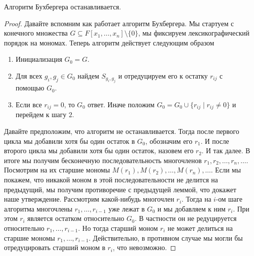 \begin{claim}
\label{claim::BuchbergerTerminates}
Алгоритм Бухбергера останавливается.
\end{claim}
\begin{proof}
Давайте вспомним как работает алгоритм Бухбергера.
Мы стартуем с конечного множества $G \subseteq F[x_1,\ldots, x_n]\setminus\{0\}$, мы фиксируем лексикографический порядок на мономах.
Теперь алгоритм действует следующим образом
\begin{enumerate}
\item Инициализация $G_0 = G$.

\item Для всех $g_i,g_j\in G_0$ найдем $S_{g_i, g_j}$ и отредуцируем его к остатку $r_{ij}$ с помощью  $G_0$.

\item Если все $r_{ij} = 0$, то $G_0$ ответ.
Иначе положим $G_0 = G_0 \cup \{r_{ij}\mid r_{ij}\neq 0\}$ и перейдем к шагу $2$.
\end{enumerate}
Давайте предположим, что алгоритм не останавливается.
Тогда после первого цикла мы добавили хотя бы один остаток в $G_0$, обозначим его $r_1$.
И после второго цикла мы добавили хотя бы один остаток, назовем его $r_2$.
И так далее.
В итоге мы получим бесконечную последовательность многочленов $r_1,r_2,\ldots, r_n,\ldots$.
Посмотрим на их старшие мономы $M(r_1), M(r_2), \ldots, M(r_n),\ldots$.
Если мы покажем, что никакой моном в этой последовательности не делится на предыдущий, мы получим противоречие с предыдущей леммой, что докажет наше утверждение.
Рассмотрим какой-нибудь многочлен $r_i$.
Тогда на $i$-ом шаге алгоритма многочлены $r_1,\ldots, r_{i-1}$ уже лежат в $G_0$ и мы добавляем к ним $r_i$.
При этом $r_i$ является остатком относительно $G_0$.
В частности он не редуцируется относительно $r_1,\ldots, r_{i-1}$.
Но тогда старший моном $r_i$ не может делиться на старшие мономы $r_1,\ldots,r_{i-1}$.
Действительно, в противном случае мы могли бы отредуцировать старший моном в $r_i$, что невозможно.
\end{proof}

